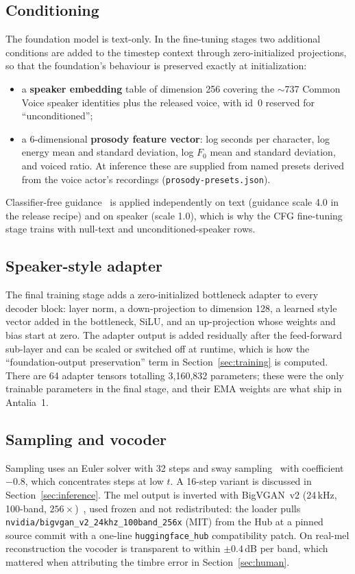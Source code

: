 \documentclass[10pt,twocolumn]{article}
\newcommand{\antalia}{Antalia~1}
\newcommand{\code}[1]{\texttt{#1}}
\begin{document}
\subsection{Conditioning}

The foundation model is text-only. In the fine-tuning stages two additional conditions are added to the timestep context through zero-initialized projections, so that the foundation's behaviour is preserved exactly at initialization:
\begin{itemize}
  \item a \textbf{speaker embedding} table of dimension 256 covering the $\sim$737 Common Voice speaker identities plus the released voice, with id~0 reserved for ``unconditioned'';
  \item a 6-dimensional \textbf{prosody feature vector}: log seconds per character, log energy mean and standard deviation, log $F_0$ mean and standard deviation, and voiced ratio. At inference these are supplied from named presets derived from the voice actor's recordings (\code{prosody-presets.json}).
\end{itemize}
Classifier-free guidance~\citep{ho2022cfg} is applied independently on text (guidance scale 4.0 in the release recipe) and on speaker (scale 1.0), which is why the CFG fine-tuning stage trains with null-text and unconditioned-speaker rows.

\subsection{Speaker-style adapter}

The final training stage adds a zero-initialized bottleneck adapter to every decoder block: layer norm, a down-projection to dimension 128, a learned style vector added in the bottleneck, SiLU, and an up-projection whose weights and bias start at zero. The adapter output is added residually after the feed-forward sub-layer and can be scaled or switched off at runtime, which is how the ``foundation-output preservation'' term in Section~\ref{sec:training} is computed. There are 64 adapter tensors totalling 3,160,832 parameters; these were the only trainable parameters in the final stage, and their EMA weights are what ship in \antalia.

\subsection{Sampling and vocoder}

Sampling uses an Euler solver with 32 steps and sway sampling~\citep{chen2024f5tts} with coefficient $-0.8$, which concentrates steps at low $t$. A 16-step variant is discussed in Section~\ref{sec:inference}. The mel output is inverted with BigVGAN~v2 (24\,kHz, 100-band, $256\times$)~\citep{lee2023bigvgan}, used frozen and not redistributed: the loader pulls \code{nvidia/bigvgan\_v2\_24khz\_100band\_256x} (MIT) from the Hub at a pinned source commit with a one-line \code{huggingface\_hub} compatibility patch. On real-mel reconstruction the vocoder is transparent to within $\pm0.4$\,dB per band, which mattered when attributing the timbre error in Section~\ref{sec:human}.
\end{document}
